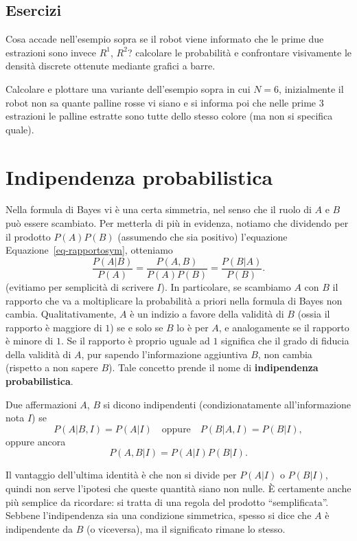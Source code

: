 \documentclass[
  italian,
  letterpaper,
]{book}
\theoremstyle{definition}
\theoremstyle{remark}
\begin{document}
\subsection{Esercizi}\label{esercizi-6}

Cosa accade nell'esempio sopra se il robot viene informato che le prime
due estrazioni sono invece \(R^1\), \(R^2\)? calcolare le probabilità e
confrontare visivamente le densità discrete ottenute mediante grafici a
barre.

Calcolare e plottare una variante dell'esempio sopra in cui \(N=6\),
inizialmente il robot non sa quante palline rosse vi siano e si informa
poi che nelle prime \(3\) estrazioni le palline estratte sono tutte
dello stesso colore (ma non si specifica quale).

\section{Indipendenza probabilistica}\label{sec-indipendenza}

Nella formula di Bayes vi è una certa simmetria, nel senso che il ruolo
di \(A\) e \(B\) può essere scambiato. Per metterla di più in evidenza,
notiamo che dividendo per il prodotto \(P(A)P(B)\) (assumendo che sia
positivo) l'equazione Equazione~\ref{eq-rapportosym}, otteniamo
\[  \frac{ P(A | B )}{P(A)} = \frac{P(A, B)}{P(A)P(B)} = \frac{ P(B | A )}{P(B)}. \]
(evitiamo per semplicità di scrivere \(I\)). In particolare, se
scambiamo \(A\) con \(B\) il rapporto che va a moltiplicare la
probabilità a priori nella formula di Bayes non cambia.
Qualitativamente, \(A\) è un indizio a favore della validità di \(B\)
(ossia il rapporto è maggiore di \(1\)) se e solo se \(B\) lo è per
\(A\), e analogamente se il rapporto è minore di \(1\). Se il rapporto è
proprio uguale ad \(1\) significa che il grado di fiducia della validità
di \(A\), pur sapendo l'informazione aggiuntiva \(B\), non cambia
(rispetto a non sapere \(B\)). Tale concetto prende il nome di
\textbf{indipendenza probabilistica}.

Due affermazioni \(A\), \(B\) si dicono indipendenti (condizionatamente
all'informazione nota \(I\)) se
\[ P(A| B,I) = P(A | I ) \quad \text{oppure} \quad  P(B| A,I) = P(B| I ),\]
oppure ancora \[ P(A, B|I) = P(A|I) P(B|I). \]

Il vantaggio dell'ultima identità è che non si divide per \(P(A|I)\) o
\(P(B|I)\), quindi non serve l'ipotesi che queste quantità siano non
nulle. È certamente anche più semplice da ricordare: si tratta di una
regola del prodotto ``semplificata''. Sebbene l'indipendenza sia una
condizione simmetrica, spesso si dice che \(A\) è indipendente da \(B\)
(o viceversa), ma il significato rimane lo stesso.
\end{document}
